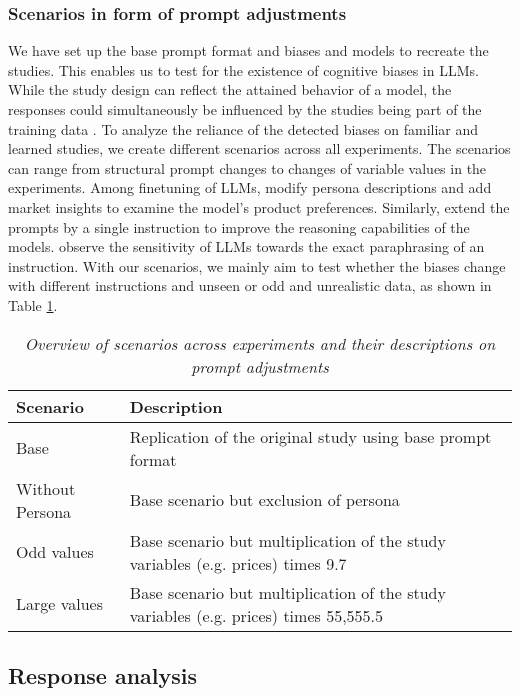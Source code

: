 \subsubsection{Scenarios in form of prompt adjustments}
\label{methodologies:scenarios}
\par We have set up the base prompt format and biases and models to recreate the studies. This enables us to test for the existence of cognitive biases in LLMs. While the study design can reflect the attained behavior of a model, the responses could simultaneously be influenced by the studies being part of the training data \parencite{brand2023using}. To analyze the reliance of the detected biases on familiar and learned studies, we create different scenarios across all experiments. The scenarios can range from structural prompt changes to changes of variable values in the experiments. Among finetuning of LLMs, \textcite{brand2023using} modify persona descriptions and add market insights to examine the model's product preferences. Similarly, \textcite{kojima2022large} extend the prompts by a single instruction to improve the reasoning capabilities of the models. \textcite{mizrahi2024state} observe the sensitivity of LLMs towards the exact paraphrasing of an instruction. With our scenarios, we mainly aim to test whether the biases change with different instructions and unseen or odd and unrealistic data, as shown in Table \ref{tab:scenarios}.
\begin{table}[h!]
    \centering
    \begin{tabular}{@{}p{4cm}p{11cm}@{}}
    \toprule
    \textbf{Scenario} & \textbf{Description} \\ \midrule
    Base & Replication of the original study using base prompt format \\ \addlinespace
    Without Persona & Base scenario but exclusion of persona \\ \addlinespace
    Odd values & Base scenario but multiplication of the study variables (e.g. prices) times 9.7 \\ \addlinespace
    Large values & Base scenario but multiplication of the study variables (e.g. prices) times 55,555.5 \\ \bottomrule
    \end{tabular}
    \caption[Scenario overview]{\centering \textit{Overview of scenarios across experiments and their descriptions on prompt adjustments}}
    \label{tab:scenarios}
\end{table}


\subsection{Response analysis}

